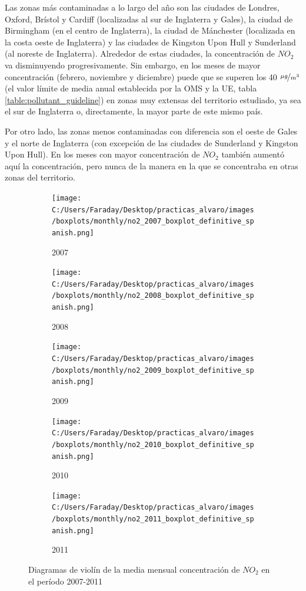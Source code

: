 \documentclass[12pt]{article}
\begin{document}
Las zonas más contaminadas a lo largo del año son las ciudades de Londres, Oxford, Brístol y Cardiff (localizadas al sur de Inglaterra y Gales), la ciudad de Birmingham (en el centro de Inglaterra), la ciudad de Mánchester (localizada en la costa oeste de Inglaterra) y las ciudades de Kingston Upon Hull y Sunderland (al noreste de Inglaterra). Alrededor de estas ciudades, la concentración de $NO_{2}$ va disminuyendo progresivamente. Sin embargo, en los meses de mayor concentración (febrero, noviembre y diciembre) puede que se superen los 40 $\nicefrac{\mu g}{m^3}$ (el valor límite de media anual establecida por la OMS y la UE, tabla \ref{table:pollutant_guideline}) en zonas muy extensas del territorio estudiado, ya sea el sur de Inglaterra o, directamente, la mayor parte de este mismo país.

Por otro lado, las zonas menos contaminadas con diferencia son el oeste de Gales y el norte de Inglaterra (con excepción de las ciudades de Sunderland y Kingston Upon Hull). En los meses con mayor concentración de $NO_{2}$ también aumentó aquí la concentración, pero nunca de la manera en la que se concentraba en otras zonas del territorio.

\begin{figure}[H]
\centering
\begin{subfigure}[H]{0.45\textwidth}
\texttt{[image: C:/Users/Faraday/Desktop/practicas\_alvaro/images/boxplots/monthly/no2\_2007\_boxplot\_definitive\_spanish.png]}
\captionsetup{labelformat=empty}
\caption{2007}
\label{fig:box-no2-2007}
\end{subfigure}
%
\begin{subfigure}[H]{0.45\textwidth}
\texttt{[image: C:/Users/Faraday/Desktop/practicas\_alvaro/images/boxplots/monthly/no2\_2008\_boxplot\_definitive\_spanish.png]}
\captionsetup{labelformat=empty}
\caption{2008}
\label{fig:box-no2-2008}
\end{subfigure}

\begin{subfigure}[H]{0.45\textwidth}
\texttt{[image: C:/Users/Faraday/Desktop/practicas\_alvaro/images/boxplots/monthly/no2\_2009\_boxplot\_definitive\_spanish.png]}
\captionsetup{labelformat=empty}
\caption{2009}
\label{fig:box-no2-2009}
\end{subfigure}
%
\begin{subfigure}[H]{0.45\textwidth}
\texttt{[image: C:/Users/Faraday/Desktop/practicas\_alvaro/images/boxplots/monthly/no2\_2010\_boxplot\_definitive\_spanish.png]}
\captionsetup{labelformat=empty}
\caption{2010}
\label{fig:box-no2-2010}
\end{subfigure}

\begin{subfigure}[H]{0.45\textwidth}
\texttt{[image: C:/Users/Faraday/Desktop/practicas\_alvaro/images/boxplots/monthly/no2\_2011\_boxplot\_definitive\_spanish.png]}
\captionsetup{labelformat=empty}
\caption{2011}
\label{fig:box-no2-2011}
\end{subfigure}
\caption{Diagramas de violín de la media mensual concentración de $NO_{2}$ en el período 2007-2011}
\label{fig:box-no2-monthly}
\end{figure}
\end{document}
